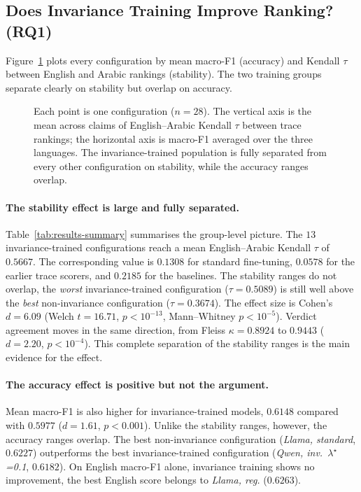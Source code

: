 \subsection{Does Invariance Training Improve Ranking? (RQ1)}
\label{subsec:res-invariance}

Figure~\ref{fig:results-tradeoff} plots every configuration by mean macro-F1 (accuracy) and Kendall
$\tau$ between English and Arabic rankings (stability). The two training groups separate clearly on
stability but overlap on accuracy.

\begin{figure}[htbp]
  \centering
  
  \caption{Each point is one configuration ($n=28$). The vertical axis is the mean across claims of
  English--Arabic Kendall $\tau$ between trace rankings; the horizontal axis is macro-F1 averaged over
  the three languages. The invariance-trained population is fully separated from every other
  configuration on stability, while the accuracy ranges overlap.}
  \label{fig:results-tradeoff}
\end{figure}


\paragraph{The stability effect is large and fully separated.}
Table~\ref{tab:results-summary} summarises the group-level picture.
The $13$ invariance-trained configurations reach a mean English--Arabic Kendall $\tau$ of $0.5667$.
The corresponding value is $0.1308$ for standard fine-tuning, $0.0578$ for the earlier trace
scorers, and $0.2185$ for the baselines. The stability ranges do not overlap, the \emph{worst}
invariance-trained configuration ($\tau = 0.5089$) is still well above the \emph{best}
non-invariance configuration ($\tau = 0.3674$). The effect size is Cohen's $d = 6.09$
(Welch $t = 16.71$, $p < 10^{-13}$, Mann--Whitney $p < 10^{-5}$). Verdict agreement moves in the same
direction, from Fleiss $\kappa = 0.8924$ to $0.9443$ ($d = 2.20$, $p < 10^{-4}$). This complete
separation of the stability ranges is the main evidence for the effect.

\paragraph{The accuracy effect is positive but not the argument.}
Mean macro-F1 is also higher for invariance-trained models, $0.6148$ compared with $0.5977$
($d = 1.61$, $p < 0.001$). Unlike the stability ranges, however, the accuracy ranges overlap. The
best non-invariance configuration (\emph{Llama, standard}, $0.6227$) outperforms the best
invariance-trained configuration (\emph{Qwen, inv.\ $\lambda^\star$=0.1}, $0.6182$). On English
macro-F1 alone, invariance training shows no improvement, the best English score belongs to
\emph{Llama, reg.} ($0.6263$).

